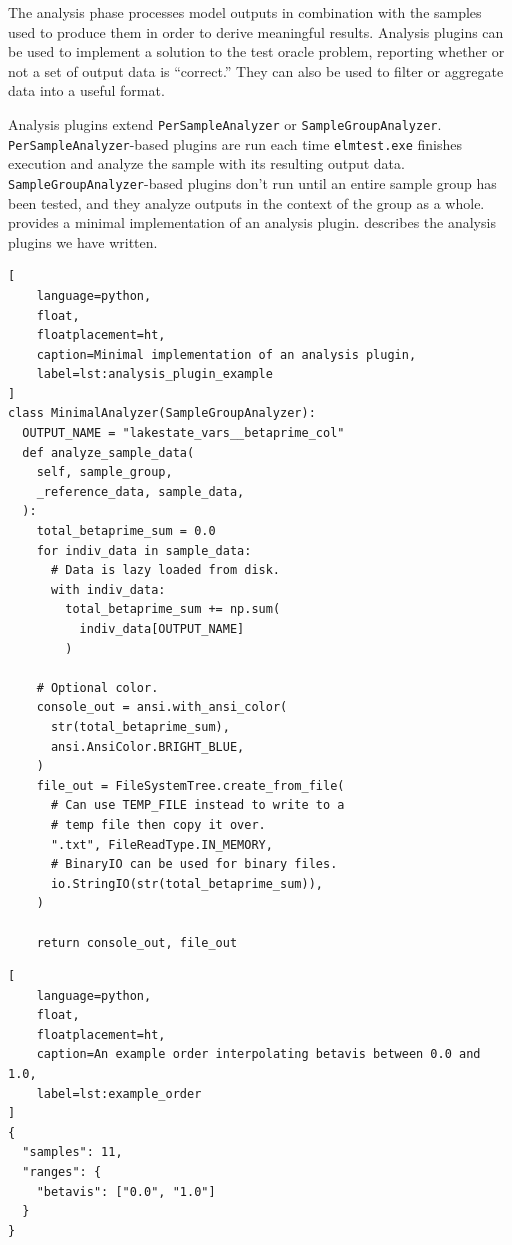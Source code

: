 \documentclass[10pt,twocolumn]{article}
\begin{document}
The analysis phase processes model outputs in combination with the samples used to 
produce them in order to derive meaningful results. Analysis plugins can be used to 
implement a solution to the test oracle problem, reporting whether or not a set of output data is ``correct.'' They can also be used to filter or aggregate data into a 
useful format.

Analysis plugins extend \verb|PerSampleAnalyzer| or \verb|SampleGroupAnalyzer|.
\verb|PerSampleAnalyzer|-based plugins are run each time
\verb|elmtest.exe| finishes execution and analyze the sample with its
resulting output data. \verb|SampleGroupAnalyzer|-based plugins don't run until an entire
sample group has been tested, and they analyze outputs in the context of the group as a
whole.  provides a minimal implementation of an 
analysis plugin.   describes the analysis plugins we have 
written.

\begin{lstlisting}[
    language=python,
    float,
    floatplacement=ht,
    caption=Minimal implementation of an analysis plugin,
    label=lst:analysis_plugin_example
]
class MinimalAnalyzer(SampleGroupAnalyzer):
  OUTPUT_NAME = "lakestate_vars__betaprime_col"
  def analyze_sample_data(
    self, sample_group,
    _reference_data, sample_data,
  ):
    total_betaprime_sum = 0.0
    for indiv_data in sample_data:
      # Data is lazy loaded from disk.
      with indiv_data:
        total_betaprime_sum += np.sum(
          indiv_data[OUTPUT_NAME]
        )

    # Optional color.
    console_out = ansi.with_ansi_color(
      str(total_betaprime_sum),
      ansi.AnsiColor.BRIGHT_BLUE,
    )
    file_out = FileSystemTree.create_from_file(
      # Can use TEMP_FILE instead to write to a
      # temp file then copy it over.
      ".txt", FileReadType.IN_MEMORY,
      # BinaryIO can be used for binary files.
      io.StringIO(str(total_betaprime_sum)),
    )

    return console_out, file_out
\end{lstlisting}

\begin{lstlisting}[
    language=python,
    float,
    floatplacement=ht,
    caption=An example order interpolating betavis between 0.0 and 1.0,
    label=lst:example_order
]
{
  "samples": 11,
  "ranges": {
    "betavis": ["0.0", "1.0"]
  }
}
\end{lstlisting}
\end{document}
